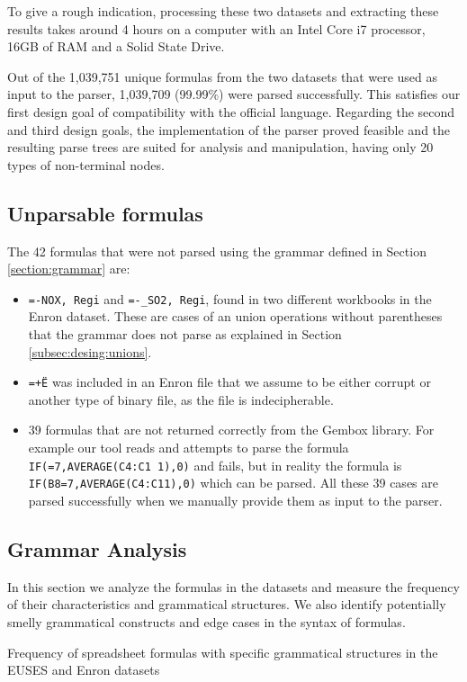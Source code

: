 \documentclass[conference]{IEEEtran}
\begin{document}
To give a rough indication, processing these two datasets and extracting these results takes around 4 hours on a computer with an Intel Core i7 processor, 16GB of RAM and a Solid State Drive.

Out of the 1,039,751 unique formulas from the two datasets that were used as input to the parser, 1,039,709 (99.99\%) were parsed successfully. This satisfies our first design goal of compatibility with the official language. Regarding the second and third design goals, the implementation of the parser proved feasible and the resulting parse trees are suited for analysis and manipulation, having only 20 types of non-terminal nodes.

\subsection{Unparsable formulas}
\label{subsection:unparsableFormulas}
The 42 formulas that were not parsed using the grammar defined in Section \ref{section:grammar} are:

\begin{itemize}
	\item \texttt{=-NOX, Regi} and \texttt{=-_SO2, Regi}, found in two different workbooks in the Enron dataset. These are cases of an union operations without parentheses that the grammar does not parse as explained in Section \ref{subsec:desing:unions}.
	\item \texttt{=+Ë\textperthousand} was included in an Enron file that we assume to be either corrupt or another type of binary file, as the file is indecipherable.
	\item 39 formulas that are not returned correctly from the Gembox library. For example our tool reads and attempts to parse the formula \texttt{IF(=7,AVERAGE(C4:C1 1),0)} and fails, but in reality the formula is \texttt{IF(B8=7,AVERAGE(C4:C11),0)} which can be parsed. All these 39 cases are parsed successfully when we manually provide them as input to the parser.
\end{itemize}

\subsection{Grammar Analysis}
\label{subsection:grammarAnalysis}
In this section we analyze the formulas in the datasets and measure the frequency of their characteristics and grammatical structures. We also identify potentially smelly grammatical constructs and edge cases in the syntax of formulas.
\begin{table}
	\caption{Frequency of spreadsheet formulas with specific grammatical structures in the EUSES and Enron datasets}
	\label{table:occurences}
	\centering
	
\end{table}
\end{document}
